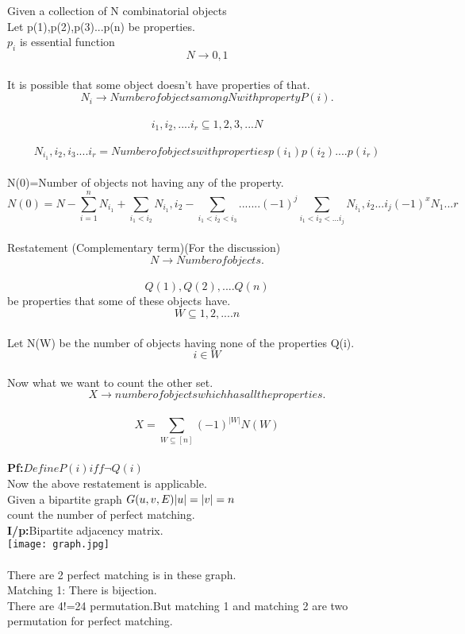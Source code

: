 Given a collection of N combinatorial objects \\
Let p(1),p(2),p(3)...p(n) be properties.\\
$p_i$ is essential function \\
$$ N \to {0,1}   $$\\
It is possible that some object doesn't have properties of that.\\
$$N_i \to Number of objects among N with property P(i).$$\\
$$ {i_1,i_2,....i_r} \subseteq {1,2,3,...N} $$\\
$$N_i_1,i_2,i_3....i_r = Number of objects with properties p(i_1) p(i_2)....p(i_r) $$\\
N(0)=Number of objects not having any of the property.\\
$$ N(0)=N-\sum_{i=1}^{n} N_i_1 +\sum_{i_1<i_2}N_i_1,i_2 -\sum_{i_1 < i_2 <i_3}.......(-1)^{j} \sum_{i_1<i_2<...i_j}N_i_1,i_2...i_j (-1)^{x}N_1...r   $$\\
Restatement (Complementary term)(For the discussion)\\
$$N \to Number of objects.$$\\
$$Q(1),Q(2),....Q(n) $$be properties that some of these objects have.\\
$$W \subseteq {1,2,....n}  $$\\
Let N(W) be the number of objects having none of the properties Q(i).\\
$$i \in W   $$\\
Now what we want to count the other set.\\
$$X \to number of objects which has all the properties.$$\\
$$X = \sum_{W \subseteq [n]}(-1)^{|W|} N(W)   $$\\
\textbf{Pf:}$Define P(i) iff \neg Q(i)$\\
Now the above restatement is applicable.\\
Given a bipartite graph $G(u,v,E)\\
  |u|=|v|=n $\\
count the number of perfect matching.\\
\textbf{I/p:}Bipartite adjacency matrix.\\
\texttt{[image: graph.jpg]}\\ \\
There are 2 perfect matching is in these graph.\\
Matching 1: There is bijection.\\
There are 4!=24 permutation.But matching 1 and matching 2 are two permutation for perfect matching.\\
